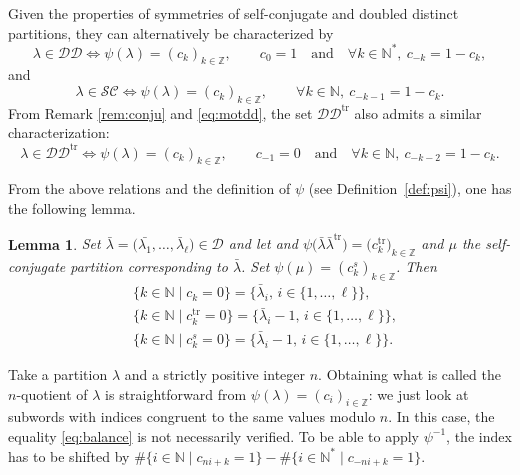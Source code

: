 \documentclass[10pt,a4paper]{amsart}
\newtheorem{Lemma}[Theorem]{Lemma}
\numberwithin{equation}{section}
\def\ccsc{\mathcal {SC}}
\def\ccdd{\mathcal {DD}}
\def\ccd{\mathcal {D}}
\newcommand{\Z}{\mathbb{Z}}
\newcommand{\N}{\mathbb{N}}
\begin{document}
Given the properties of symmetries of self-conjugate and doubled distinct partitions, they can alternatively be characterized by
\begin{equation}\label{eq:motdd}
\lambda\in\ccdd \iff \psi(\lambda)=(c_k)_{k\in\Z}, \qquad c_0=1  \quad \text{and} \quad  \forall k \in \N^*,\ c_{-k}=1-c_k,
\end{equation}
and
\begin{equation*}%
\lambda\in\ccsc \iff \psi(\lambda)=(c_k)_{k\in\Z}, \qquad \forall k \in \N,\ c_{-k-1}=1-c_k.
\end{equation*}
From Remark \ref{rem:conju} and \eqref{eq:motdd}, the set $\ccdd^{\mathrm{tr}}$ also admits a similar characterization:
\begin{equation}\label{eq:motddprime}
\lambda\in\ccdd ^{\mathrm{tr}}\iff \psi(\lambda)=(c_k)_{k\in\Z},\qquad  c_{-1}=0  \quad \text{and} \quad  \forall k \in \N,\ c_{-k-2}=1-c_k.
\end{equation}

From the above relations and the definition of $\psi$ (see Definition~\ref{def:psi}), one has the following lemma.
\begin{Lemma}\label{lem:distinct}
Set $\bar{\lambda}=\bigl(\bar{\lambda_1},\dots,\bar{\lambda}_\ell\bigr)\in\ccd$ and let \smash{$\psi\bigl(\bar{\lambda}\bar{\lambda}\bigr)=(c_k)_{k\in\Z}$} and $\psi\bigl(\bar{\lambda}\bar{\lambda}^{\mathrm{tr}}\bigr)=\bigl(c^{\mathrm{tr}}_k\bigr)_{k\in\Z}$ and $\mu$ the self-conjugate partition corresponding to $\bar{\lambda}$. Set $\psi(\mu)=(c^{s}_k)_{k\in\Z}$. Then
\begin{align*}
&\lbrace k\in\N\mid c_k=0\rbrace=\bigl\lbrace \bar{\lambda}_i,\, i\in\lbrace 1,\dots,\ell\rbrace\bigr\rbrace,\\
&\bigl\lbrace k\in\N\mid c^{\mathrm{tr}}_k=0\bigr\rbrace=\big\lbrace \bar{\lambda}_i-1,\, i\in\lbrace 1,\dots,\ell\rbrace\big\rbrace,\\
&\lbrace k\in\N\mid c^{s}_k=0\rbrace=\big\lbrace \bar{\lambda}_i-1,\, i\in\lbrace 1,\dots,\ell\rbrace\big\rbrace.
\end{align*}
\end{Lemma}

Take a partition $\lambda$ and a strictly positive integer $n$. Obtaining what is called the $n$-quotient of $\lambda$ is straightforward from $\psi(\lambda)=(c_i)_{i\in\Z}$: we just look at subwords with indices congruent to the same values modulo $n$. In this case, the equality \eqref{eq:balance} is not necessarily verified. To be able to apply $\psi^{-1}$, the index has to be shifted by $\#\lbrace i\in\N \mid c_{ni+k}=1\rbrace-\#\lbrace i\in\N^* \mid c_{-ni+k}=1\rbrace$.
\end{document}
